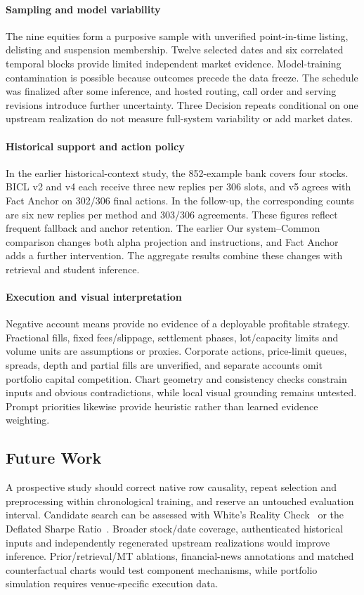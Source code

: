 \paragraph{Sampling and model variability}
The nine equities form a purposive sample with unverified point-in-time listing, delisting and suspension membership. Twelve selected dates and six correlated temporal blocks provide limited independent market evidence. Model-training contamination is possible because outcomes precede the data freeze. The schedule was finalized after some inference, and hosted routing, call order and serving revisions introduce further uncertainty. Three Decision repeats conditional on one upstream realization do not measure full-system variability or add market dates.

\paragraph{Historical support and action policy}
In the earlier historical-context study, the 852-example bank covers four stocks. BICL v2 and v4 each receive three new replies per 306 slots, and v5 agrees with Fact Anchor on 302/306 final actions. In the follow-up, the corresponding counts are six new replies per method and 303/306 agreements. These figures reflect frequent fallback and anchor retention. The earlier Our system--Common comparison changes both alpha projection and instructions, and Fact Anchor adds a further intervention. The aggregate results combine these changes with retrieval and student inference.

\paragraph{Execution and visual interpretation}
Negative account means provide no evidence of a deployable profitable strategy. Fractional fills, fixed fees/slippage, settlement phases, lot/capacity limits and volume units are assumptions or proxies. Corporate actions, price-limit queues, spreads, depth and partial fills are unverified, and separate accounts omit portfolio capital competition. Chart geometry and consistency checks constrain inputs and obvious contradictions, while local visual grounding remains untested. Prompt priorities likewise provide heuristic rather than learned evidence weighting.

\subsection{Future Work}
A prospective study should correct native row causality, repeat selection and preprocessing within chronological training, and reserve an untouched evaluation interval. Candidate search can be assessed with White's Reality Check~\cite{white2000reality} or the Deflated Sharpe Ratio~\cite{bailey2014deflated}. Broader stock/date coverage, authenticated historical inputs and independently regenerated upstream realizations would improve inference. Prior/retrieval/MT ablations, financial-news annotations and matched counterfactual charts would test component mechanisms, while portfolio simulation requires venue-specific execution data.

